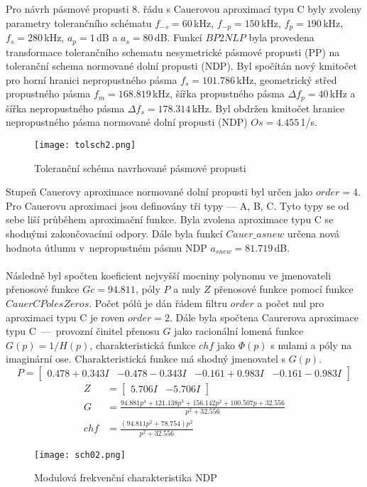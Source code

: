 Pro návrh pásmové propusti 8. řádu s Cauerovou aproximací typu C byly zvoleny parametry tolerančního schématu $f_{-s} = 60$\,kHz, $f_{-p} = 150$\,kHz, $f_p = 190$\,kHz, $f_s = 280$\,kHz, $a_p = 1$\,dB a $a_s = 80$\,dB. 
Funkcí $BP2NLP$ byla provedena transformace tolerančního schematu nesymetrické pásmové propusti (PP) na toleranční schema normované dolní propusti (NDP). Byl spočítán nový kmitočet pro horní hranici nepropustného pásma $f_s = 101.786$\,kHz, geometrický střed propustného pásma $f_m = 168.819$\,kHz, šířka propustného pásma $\Delta{f_p} = 40$\,kHz a šířka nepropustného pásma $\Delta{f_s} = 178.314$\,kHz. Byl obdržen kmitočet hranice nepropustného pásma normované dolní propusti (NDP) $Os = 4.455$\,1/s.
\begin{figure}[h]
\centering
\texttt{[image: tolsch2.png]}
\caption{Toleranční schéma navrhované pásmové propusti}
\end{figure}
\noindent Stupeň Cauerovy aproximace normované dolní propusti byl určen jako $order = 4$. Pro Cauerovu aproximaci jsou definovány tři typy --- A, B, C. Tyto typy se od sebe liší průběhem aproximační funkce. Byla zvolena aproximace typu C se shodnými zakončovacími odpory.
\noindent Dále byla funkcí $Cauer\_asnew$ určena nová hodnota útlumu v~nepropustném pásmu NDP $a_{snew} = 81.719$\,dB.\\
\\
Následně byl spočten koeficient nejvyšší mocniny polynomu ve jmenovateli přenosové funkce $Gc = 94.811$, póly $P$ a nuly $Z$ přenosové funkce pomocí funkce $CauerCPolesZeros$. Počet pólů je dán řádem filtru $order$ a počet nul pro aproximaci typu C je roven $order = 2$. Dále byla spočtena Caurerova aproximace typu C~---~provozní činitel přenosu $G$ jako racionální lomená funkce $G(p) = 1/H(p)$, charakteristická funkce $chf$ jako $\Phi(p)$ s nulami a póly na imaginární ose. Charakteristická funkce má shodný jmenovatel s $G(p)$.
\newpage
\begin{equation}
P = 
\begin{bmatrix}
0.478 + 0.343 I & -0.478 - 0.343 I & -0.161 + 0.983 I & -0.161 - 0.983 I
\end{bmatrix}
\end{equation}
\begin{align}
Z &=
\begin{bmatrix}
5.706 I & -5.706 I
\end{bmatrix}\\
G &= \frac{94.881p^4+121.138p^3+156.142p^2+100.507p+32.556}{p^2+32.556}\\
chf &= \frac{(94.811p^2+78.754)p^2}{p^2+32.556}
\end{align}
\begin{figure}[h]
\centering
\texttt{[image: sch02.png]}
\caption{Modulová frekvenční charakteristika NDP}
\end{figure}
